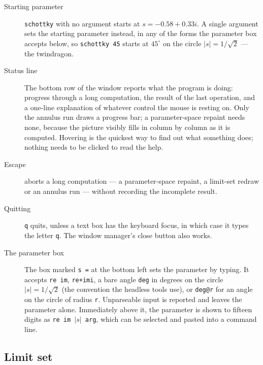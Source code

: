 \documentclass{amsart}
\begin{document}
\begin{description}
\item[Starting parameter] \texttt{schottky} with no argument starts at
$s = -0.58 + 0.33i$.  A single argument sets the starting parameter instead, in any of the
forms the parameter box accepts below, so \texttt{schottky 45} starts at $45^\circ$ on the
circle $|s| = 1/\sqrt2$ --- the twindragon.
\item[Status line] The bottom row of the window reports what the program is doing: progress
through a long computation, the result of the last operation, and a one-line
explanation of whatever control the mouse is resting on.  Only the annulus run draws a
progress bar; a parameter-space repaint needs none, because the picture visibly fills in
column by column as it is computed.  Hovering is the quickest way to
find out what something does; nothing needs to be clicked to read the help.
\item[Escape] aborts a long computation --- a parameter-space repaint, a limit-set redraw
or an annulus run --- without recording the incomplete result.
\item[Quitting] \texttt{q} quits, unless a text box has the keyboard focus, in which case it
types the letter \texttt{q}.  The window manager's close button also works.
\item[The parameter box] The box marked \texttt{s =} at the bottom left sets the parameter by
typing.  It accepts \texttt{re im}, \texttt{re+imi}, a bare angle \texttt{deg} in degrees on
the circle $|s| = 1/\sqrt2$ (the convention the headless tools use), or \texttt{deg@r} for an
angle on the circle of radius \texttt{r}.  Unparseable input is reported and leaves the
parameter alone.  Immediately above it, the parameter is shown to fifteen digits as
\texttt{re im $|s|$ arg}, which can be selected and pasted into a command line.
\end{description}

\subsection{Limit set}
\end{document}
